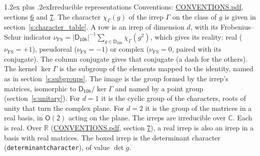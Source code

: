 \documentclass[10pt,a4paper]{article}
\makeatletter
\renewcommand\section{\@startsection{section}{1}{\z@}{-3ex plus -1ex minus -.2ex}%
  {1.2ex plus .2ex}{\normalfont\large\sffamily\bfseries\color{parttitle}}}
\numberwithin{equation}{section}
\newcommand{\grp}[1]{\mathsf{#1}}
\newcommand{\irchar}[1]{\chi_{#1}}
\newcommand{\fsind}{\nu_{\mathrm{FS}}}
\makeatother
\begin{document}
\section{Irreducible representations}\label{s:irreps}
Conventions: \href{../../CONVENTIONS.pdf}{CONVENTIONS.pdf}, sections \href{../../CONVENTIONS.pdf\#conv.6}{6} and \href{../../CONVENTIONS.pdf\#conv.7}{7}.
\leavevmode\label{n:function.character}\label{n:irrep.Gamma}The character $\irchar{\Gamma}(g)$ of the irrep $\Gamma$ on the class of $g$ is given in section~\ref{s:character_table}.
\leavevmode\label{n:index.dimension}\label{n:index.frobenius}\label{n:head.irrep}\label{n:head.reality}A row is an irrep of dimension $d$, with its Frobenius--Schur indicator $\fsind = |\grp{D_{10h}}|^{-1}\allowbreak\sum_{g\in\grp{D_{10h}}}\irchar{\Gamma}(g^2)$, which gives its reality: real ($\fsind = +1$), pseudoreal ($\fsind = -1$) or complex ($\fsind = 0$, paired with its conjugate). \label{n:head.conjugate}The column conjugate gives that conjugate (a dash for the others). \label{n:head.kernel}The kernel $\ker\Gamma$ is the subgroup of the elements mapped to the identity, named as in section~\ref{s:subgroups}. \label{n:head.image}The image is the group formed by the irrep's matrices, isomorphic to $\grp{D_{10h}}/\ker\Gamma$ and named by a point group (section~\ref{s:unitary}). For $d = 1$ it is the cyclic group of the characters, roots of unity that turn the complex plane. For $d = 2$ it is the group of the matrices in a real basis, in $\grp{O(2)}$ acting on the plane. The irreps are irreducible over $\mathbb{C}$. Each is real. Over $\mathbb{R}$ (\href{../../CONVENTIONS.pdf}{CONVENTIONS.pdf}, section \href{../../CONVENTIONS.pdf\#conv.7}{7}), a real irrep is also an irrep in a basis with real matrices. \label{n:mark.determinant}The boxed irrep is the determinant character (\texttt{determinantcharacter}), of value $\det g$.
\setlength{\emergencystretch}{2em}\par\setlength{\emergencystretch}{0pt}
\end{document}
